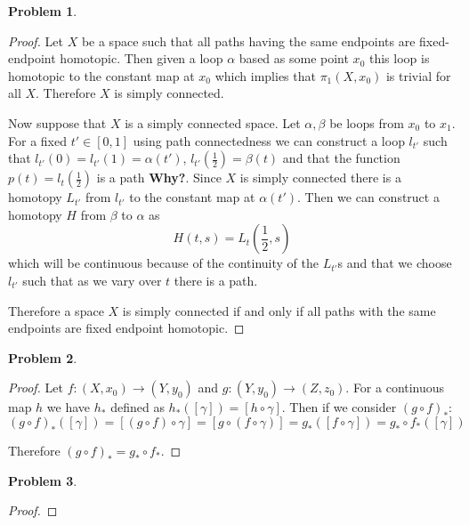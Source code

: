 \documentclass[10pt]{article}
\newcommand{\sk}{\vskip 10mm}
\theoremstyle{plain}
\newtheorem{problem}{Problem}
\theoremstyle{remark}
\begin{document}
\begin{problem}
  
\end{problem} %

\begin{proof}
  Let $X$ be a space such that all paths having the same endpoints are fixed-endpoint
  homotopic. Then given a loop $\alpha$ based as some point $x_0$ this loop is homotopic
  to the constant map at $x_0$ which implies that $\pi_1(X,x_0)$ is trivial for all
  $X$. Therefore $X$ is simply connected.

  Now suppose that $X$ is a simply connected space. Let $\alpha,\beta$ be loops from $x_0$ to
  $x_1$. For a fixed $t'\in [0,1]$ using path connectedness we can construct a loop
  $l_{t'}$ such that $l_{t'}(0)=l_{t'}(1)=\alpha(t')$, $l_{t'}(\frac{1}{2})=\beta(t)$ and
  that the function $p(t)=l_{t}(\frac{1}{2})$ is a path \textbf{Why?}.
  Since $X$ is simply connected there is a homotopy $L_{t'}$ from $l_{t'}$ to the
  constant map at $\alpha(t')$. Then we can construct a homotopy $H$ from $\beta$ to $\alpha$ as
  \[ H(t,s)= L_t(\frac{1}{2},s) \]
  which will be continuous because of the continuity of the $L_{t'}$s and that
  we choose $l_{t'}$ such that as we vary over $t$ there is a path.

  Therefore a space $X$ is simply connected if and only if all paths with the same
  endpoints are fixed endpoint homotopic.
\end{proof}

\sk

\begin{problem} %
  
\end{problem}

\begin{proof}
  Let $f:(X,x_0)\rightarrow (Y,y_0)$ and $g:(Y,y_0)\rightarrow (Z,z_0)$. For a continuous map
  $h$ we have $h_*$ defined as $h_*([\gamma])=[h\circ \gamma]$. Then if we consider
  $(g\circ f)_*$:
  \[ (g\circ f)_*([\gamma]) = [(g\circ f)\circ \gamma] = [g\circ (f\circ \gamma)] = g_*([f\circ\gamma])=g_*\circ f_*([\gamma])\]

  Therefore $(g\circ f)_*=g_*\circ f_*$.
\end{proof}

\sk

\begin{problem} %
  
\end{problem}

\begin{proof}
  
\end{proof}
\end{document}
